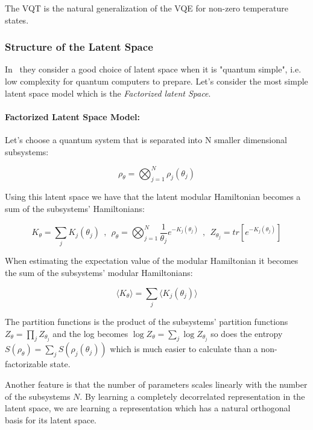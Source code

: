 The VQT is the natural generalization of the VQE for non-zero temperature states.

\subsubsection{Structure of the Latent Space}
\label{Subsubsec: VQT Latent Space}
In~\cite{verdon2019VQT} they consider a good choice of latent space when it is "quantum simple", i.e. low complexity for quantum computers to prepare. Let's consider the most simple latent space model which is the \textit{Factorized latent Space}.

\paragraph{Factorized Latent Space Model:} Let's choose a quantum system that is separated into N smaller dimensional subsystems:

\begin{equation*}
    \rho_\theta = \bigotimes_{j=1}^N \rho_j ( \theta_j )
\end{equation*}

Using this latent space we have that the latent modular Hamiltonian becomes a sum of the subsystems' Hamiltonians:

\begin{equation*}
    K_\theta = \sum_j K_j ( \theta_j ) \ \ , \ \ \rho_\theta = \bigotimes_{j=1}^N \frac{1}{\theta_j} e^{- K_j ( \theta_j )} \ \ , \ \ Z_{\theta_j} = tr[ e^{-K_j ( \theta_j )}]
\end{equation*}

When estimating the expectation value of the modular Hamiltonian it becomes the sum of the subsystems' modular Hamiltonians:

\begin{equation*}
    \langle K_\theta \rangle = \sum_j \langle K_j (\theta_j) \rangle
\end{equation*}

The partition functions is the product of the subsystems' partition functions $Z_\theta = \prod_j Z_{\theta_j}$ and the log becomes $\log Z_\theta = \sum_j \log Z_{\theta_j}$ so does the entropy $S( \rho_\theta) = \sum_j S( \rho_j ( \theta_j ) )$ which is much easier to calculate than a non-factorizable state.

Another feature is that the number of parameters scales linearly with the number of the subsystems $N$. By learning a completely decorrelated representation in the latent space, we are learning a representation which has a natural orthogonal basis for its latent space.

